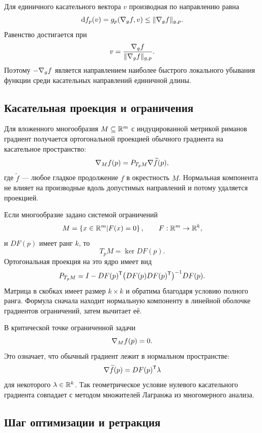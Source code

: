 Для единичного касательного вектора $v$ производная по направлению равна
\[
\mathop{}\!\mathrm{d} f_p(v)=g_p(\nabla_g f,v)
\leq\lVert\nabla_g f\rVert_{g,p}.
\]
Равенство достигается при
\[
v=\frac{\nabla_g f}{\lVert\nabla_g f\rVert_{g,p}}.
\]
Поэтому $-\nabla_g f$ является направлением наиболее быстрого локального убывания функции среди касательных направлений единичной длины.

\subsection{Касательная проекция и ограничения}

Для вложенного многообразия $M\subseteq\mathbb{R}^m$ с индуцированной метрикой риманов градиент получается ортогональной проекцией обычного градиента на касательное пространство:
\begin{equation}
\label{eq:embedded-riemannian-gradient-projection}
\nabla_M f(p)
=
P_{T_pM}\nabla \widetilde f(p),
\end{equation}
где $\widetilde f$ --- любое гладкое продолжение $f$ в окрестность $M$. Нормальная компонента не влияет на производные вдоль допустимых направлений и потому удаляется проекцией.

Если многообразие задано системой ограничений
\[
M=\left\{x\in\mathbb{R}^m\middle|F(x)=0\right\},
\qquad
F:\mathbb{R}^m\to\mathbb{R}^k,
\]
и $DF(p)$ имеет ранг $k$, то
\[
T_pM=\ker DF(p).
\]
Ортогональная проекция на это ядро имеет вид
\begin{equation}
\label{eq:constraint-tangent-projector}
P_{T_pM}
=
I-DF(p)^{\mathsf{T}}
\bigl(DF(p)DF(p)^{\mathsf{T}}\bigr)^{-1}DF(p).
\end{equation}
Матрица в скобках имеет размер $k\times k$ и обратима благодаря условию полного ранга. Формула сначала находит нормальную компоненту в линейной оболочке градиентов ограничений, затем вычитает её.

В критической точке ограниченной задачи
\[
\nabla_M f(p)=0.
\]
Это означает, что обычный градиент лежит в нормальном пространстве:
\begin{equation}
\label{eq:lagrange-geometric-form}
\nabla\widetilde f(p)
=
DF(p)^{\mathsf{T}}\lambda
\end{equation}
для некоторого $\lambda\in\mathbb{R}^k$. Так геометрическое условие нулевого касательного градиента совпадает с методом множителей Лагранжа из многомерного анализа.

\subsection{Шаг оптимизации и ретракция}

